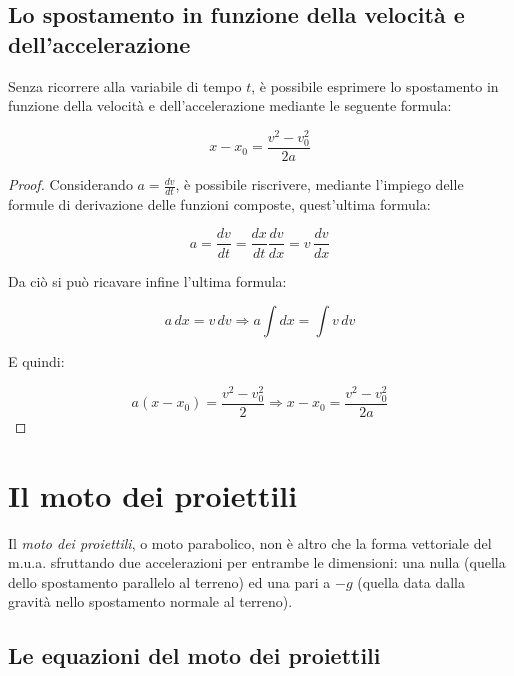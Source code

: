 \documentclass[oneside]{book}
\begin{document}
\subsection{Lo spostamento in funzione della velocità e dell'accelerazione}

Senza ricorrere alla variabile di tempo $t$, è possibile
esprimere lo spostamento in funzione della velocità e dell'accelerazione
mediante le seguente formula:

\begin{equation}
    x-x_0=\frac{v^2-v_0^2}{2a}
\end{equation}

\begin{proof}

    Considerando $a=\frac{dv}{dt}$, è possibile riscrivere, mediante l'impiego
    delle formule di derivazione delle funzioni composte, quest'ultima formula:

    \begin{equation*}
        a=\frac{dv}{dt}=\frac{dx}{dt}\frac{dv}{dx}=v\,\frac{dv}{dx}
    \end{equation*}

    Da ciò si può ricavare infine l'ultima formula:

    \begin{equation*}
        a\,dx=v\,dv \Rightarrow a \int dx = \int v \, dv
    \end{equation*}

    E quindi:

    \begin{equation*}
        a(x-x_0)=\frac{v^2-v_0^2}{2} \Rightarrow x-x_0=\frac{v^2-v_0^2}{2a}
    \end{equation*}

\end{proof}

\section{Il moto dei proiettili}

Il \textit{moto dei proiettili}, o moto parabolico, non
è altro che la forma vettoriale del m.u.a. sfruttando due accelerazioni per
entrambe le dimensioni: una nulla (quella dello spostamento parallelo al
terreno) ed una pari a $-g$ (quella data dalla gravità nello spostamento
normale al terreno).

\subsection{Le equazioni del moto dei proiettili}
\end{document}
